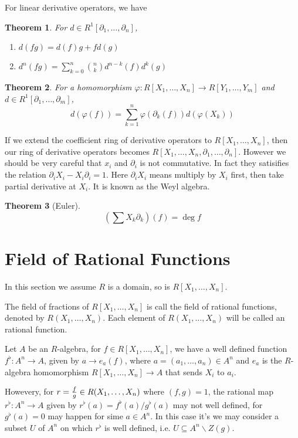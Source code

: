 \documentclass{article}
\newtheorem*{thm}{Theorem}
\begin{document}
For linear derivative operators, we have
\begin{thm}
For $d \in R^1[\partial_1, \dots, \partial_n]$,
\begin{enumerate}
\item $d(fg) = d(f)g + fd(g)$
\item $d^n(fg) = \sum^n_{k=0} {n \choose k}d^{n-k}(f) d^k(g)$
\end{enumerate}
\end{thm}

\begin{thm}
For a homomorphism $\varphi : R[X_1, \dots, X_n] \to R[Y_1, \dots, Y_m]$
and $d \in R^1[\partial_1, \dots, \partial_m]$,
$$d(\varphi(f)) = \sum_{k=1}^n \varphi(\partial_k(f)) d(\varphi(X_k))$$
\end{thm}

If we extend the coefficient ring of derivative operators to $R[X_1, \dots, X_n]$,
then our ring of derivative operators becomes $R[X_1, \dots, X_n, \partial_1, \dots, \partial_n]$.
However we should be very careful that $x_i$ and $\partial_i$ is not commutative.
In fact they satisifies the relation $\partial_i X_i - X_i \partial_i = 1$.
Here $\partial_i X_i$ means multiply by $X_i$ first, then take partial derivative at $X_i$.
It is known as the Weyl algebra.

\begin{thm}[Euler]
$$(\sum X_k \partial_k)(f) = \deg f$$
\end{thm}

\section{Field of Rational Functions}
In this section we assume $R$ is a domain, so is $R[X_1, \dots, X_n]$.

The field of fractions of $R[X_1, \dots, X_n]$ is call the field of rational functions,
denoted by $R(X_1, \dots, X_n)$. Each element of $R(X_1, \dots, X_n)$ will be called an
rational function.

Let $A$ be an $R$-algebra, for $f \in R[X_1, \dots, X_n]$, we have a well defined function
$f^\flat : A^n \to A$, given by $a \to e_a(f)$, where $a = (a_1, \dots, a_n) \in A^n$
and $e_a$ is the $R$-algebra homomorphism $R[X_1, \dots, X_n] \to A$ that sends $X_i$ to $a_i$.

Howevery, for $r = {f \over g} \in R(X_1, \dots, X_n)$ where $(f, g) = 1$, the rational map
$r^\flat : A^n \to A$ given by $r^\flat(a) = f^\flat(a) / g^\flat(a)$
may not well defined, for $g^\flat(a) = 0$ may happen for sime $a \in A^n$.
In this case it's we may consider a subset $U$ of $A^n$ on which $r^\flat$ is well defined,
i.e. $U \subseteq A^n \backslash Z(g)$.
\end{document}
